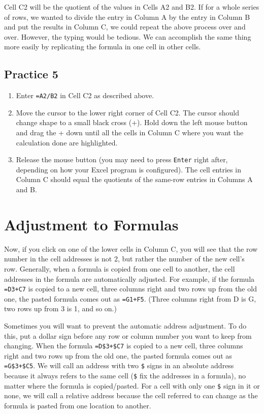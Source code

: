 \documentclass[
]{book}
\providecommand{\tightlist}{%
  \setlength{\itemsep}{0pt}\setlength{\parskip}{0pt}}
\begin{document}
Cell C2 will be the quotient of the values in Cells A2 and B2.
If for a whole series of rows, we wanted to divide the entry in Column A by the entry in Column B and put the results in Column C, we could repeat the above process over and over. However, the typing would be tedious. We can accomplish the same thing more easily by replicating the formula in one cell in other cells.

\hypertarget{practice-5}{%
\subsection{Practice 5}\label{practice-5}}

\begin{enumerate}
\def\labelenumi{\arabic{enumi}.}
\tightlist
\item
  Enter \texttt{=A2/B2} in Cell C2 as described above.
\item
  Move the cursor to the lower right corner of Cell C2. The cursor should change shape to a small black cross (+). Hold down the left mouse button and drag the + down until all the cells in Column C where you want the calculation done are highlighted.
\item
  Release the mouse button (you may need to press \texttt{Enter} right after, depending on how your Excel program is configured). The cell entries in Column C should equal the quotients of the same-row entries in Columns A and B.
\end{enumerate}

\hypertarget{adjustment-to-formulas}{%
\section{Adjustment to Formulas}\label{adjustment-to-formulas}}

Now, if you click on one of the lower cells in Column C, you will see that the row number in the cell addresses is not 2, but rather the number of the new cell's row. Generally, when a formula is copied from one cell to another, the cell addresses in the formula are automatically adjusted. For example, if the formula \texttt{=D3+C7} is copied to a new cell, three columns right and two rows up from the old one, the pasted formula comes out as \texttt{=G1+F5}. (Three columns right from D is G, two rows up from 3 is 1, and so on.)

Sometimes you will want to prevent the automatic address adjustment. To do this, put a dollar sign before any row or column number you want to keep from changing. When the formula \texttt{=D\$3+\$C7} is copied to a new cell, three columns right and two rows up from the old one, the pasted formula comes out as \texttt{=G\$3+\$C5}. We will call an address with two \texttt{\$} signs in an absolute address because it always refers to the same cell (\texttt{\$} fix the addresses in a formula), no matter where the formula is copied/pasted. For a cell with only one \texttt{\$} sign in it or none, we will call a relative address because the cell referred to can change as the formula is pasted from one location to another.
\end{document}
